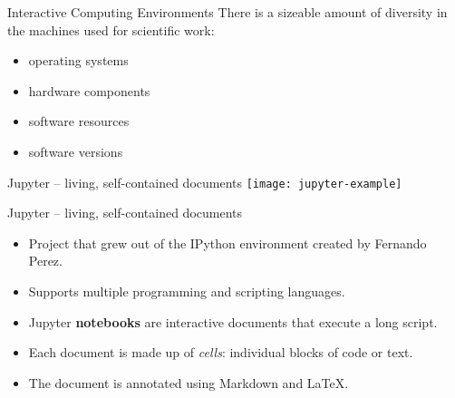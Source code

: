 \documentclass{beamer}
\begin{document}






\begin{frame}{Interactive Computing Environments}
  There is a sizeable amount of diversity in the machines used for scientific work:
  \begin{itemize}
    \item operating systems

    \item hardware components

    \item software resources

    \item software versions
  \end{itemize}
\end{frame}


\begin{frame}{Jupyter -- living, self-contained documents}
  \center
  \texttt{[image: jupyter-example]}
\end{frame}

\begin{frame}{Jupyter -- living, self-contained documents}
  \begin{itemize}
    \item Project that grew out of the IPython environment created by Fernando Perez.

    \item Supports multiple programming and scripting languages.

    \item Jupyter \textbf{notebooks} are interactive documents that execute a long script.

    \item Each document is made up of \textit{cells}: individual blocks of code or text.

    \item The document is annotated using Markdown and \LaTeX.
  \end{itemize}
\end{frame}
\end{document}

